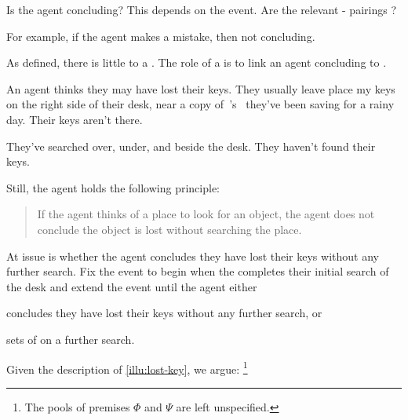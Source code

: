 \begin{note}
  Is the agent concluding?
  This depends on the event.
  Are the relevant - pairings ?

  For example, if the agent makes a mistake, then not concluding.
\end{note}

\begin{note}
  As defined, there is little to a .
  The role of a \requ{} is to link an agent concluding to .
\end{note}

\begin{note}
  \begin{scenario}%
    \label{illu:lost-key}%
    An agent thinks they may have lost their keys.
    They usually leave place my keys on the right side of their desk, near a copy of~\citeauthor{Vickers:1989tr}'s~ they've been saving for a rainy day.
    Their keys aren't there.

    They've searched over, under, and beside the desk.
    They haven't found their keys.

    Still, the agent holds the following principle:
    \begin{quote}
      If the agent thinks of a place to look for an object, the agent does not conclude the object is lost without searching the place.
    \end{quote}

  \end{scenario}

  \noindent%
  At issue is whether the agent concludes they have lost their keys without any further search.
  Fix the event to begin when the \agents{} completes their initial search of the desk and extend the event until the agent either
  \begin{enumerate*}[label=(\alph*), ref=(\alph*)]
  \item
    concludes they have lost their keys without any further search, or
  \item
    sets of on a further search.
  \end{enumerate*}

  Given the description of \autoref{illu:lost-key}, we argue:%
  \footnote{
    The pools of premises \(\Phi\) and \(\Psi\) are left unspecified.
  }


\end{note}
